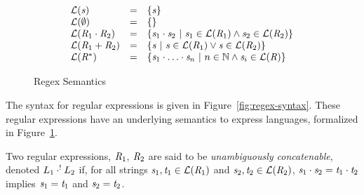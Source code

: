 \begin{figure}
\[
\begin{array}{lcl}
\mathcal{L}(\mathit{s}) &=& \{\mathit{s}\}\\
\mathcal{L}(\emptyset) &=& \{\}\\
\mathcal{L}(\mathit{R}_1\cdot\mathit{R}_2) &=&
\{\mathit{s}_1\cdot\mathit{s}_2 ~|~
\mathit{s}_1\in\mathcal{L}(\mathit{R}_1) \wedge \mathit{s}_2\in\mathcal{L}(\mathit{R}_2)\}\\
\mathcal{L}(\mathit{R}_1+\mathit{R}_2) &=&
\{\mathit{s} ~|~
\mathit{s}\in\mathcal{L}(\mathit{R}_1) \vee \mathit{s}\in\mathcal{L}(\mathit{R}_2)\}\\
\mathcal{L}(\mathit{R}^*) &=&
\{\mathit{s}_1\cdot\ldots\cdot\mathit{s}_n ~|~
n\in\mathbb{N} \wedge \mathit{s}_i\in\mathcal{L}(\mathit{R})\}
\end{array}
\]
\caption{Regex Semantics}
\label{fig:regex-semantics}
\end{figure}

The syntax for regular expressions is given in Figure~\ref{fig:regex-syntax}.
These regular expressions have an underlying semantics to express languages,
formalized in Figure~\ref{fig:regex-semantics}.

Two regular expressions, $\mathit{R}_1$, $\mathit{R}_2$ are said to be 
\textit{unambiguously concatenable}, denoted
$L_1\cdot^!L_2$ if, 
for all strings $\mathit{s}_1,\mathit{t}_1\in\mathcal{L}(\mathit{R}_1)$ and
$\mathit{s}_2,\mathit{t}_2\in\mathcal{L}(\mathit{R}_2)$,
$\mathit{s}_1\cdot\mathit{s}_2=\mathit{t}_1\cdot\mathit{t}_2$ implies
$\mathit{s}_1=\mathit{t}_1$ and $\mathit{s}_2=\mathit{t}_2$.

